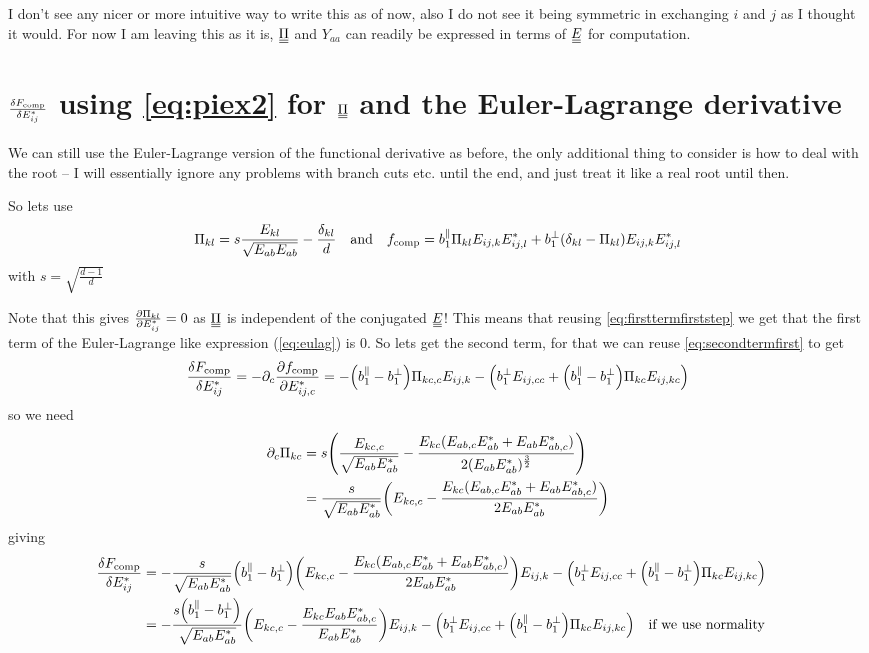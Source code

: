 \documentclass{article}
\newcommand\barbelow[1]{\stackunder[1.2pt]{$#1$}{\rule{1.5ex}{.1ex}}}
\newcommand{\du}[1]{\barbelow{\barbelow{#1}}}
\newcommand{\pp}{\partial}
\newcommand{\YY}[3][j]{E_{#2#1}E_{#3#1}^*}
\begin{document}
I don't see any nicer or more intuitive way to write this as of now, also I do not see it being symmetric in exchanging $i$ and $j$ as I thought it would.
For now I am leaving this as it is, $\du{\Pi}$ and $Y_{aa}$ can readily be expressed in terms of $\du{E}$ for computation.

\pagebreak
\section{$\fdv{F_\text{comp}}{E_{ij}^*}$ using \cref{eq:piex2} for $\du{\Pi}$ and the Euler-Lagrange derivative}
We can still use the Euler-Lagrange version of the functional derivative as before, the only additional thing to consider is how to deal with the root -- I will essentially ignore any problems with branch cuts etc. until the end, and just treat it like a real root until then.

So lets use 
\begin{equation}
    \Pi_{kl} = s \frac{E_{kl} }{\sqrt{E_{ab}E_{ab}}}- \frac{\delta_{kl}}{d} \qq{and} f_\text{comp} = b_1^\parallel \Pi_{kl} E_{ij,k}E_{ij,l}^* + b_1^\perp (\delta_{kl} - \Pi_{kl}) E_{ij,k}E_{ij,l}^*
\end{equation}
with $s = \sqrt{\frac{d-1}{d}}$

Note that this gives $\pdv{\Pi_{kl}}{E_{ij}^*} = 0$ as $\du{\Pi}$ is independent of the conjugated $\du{E}$! This means that reusing \cref{eq:firsttermfirststep} we get that the first term of the Euler-Lagrange like expression (\cref{eq:eulag}) is 0.
So lets get the second term, for that we can reuse \cref{eq:secondtermfirst} to get
\begin{equation}
    \fdv{F_\text{comp}}{E_{ij}^*} = -\pp_c \pdv{f_\text{comp}}{E_{ij,c}^*} = -\qty(b_1^\parallel - b_1^\perp) \Pi_{kc,c} E_{ij,k} - \qty(b_1^\perp E_{ij,cc} + \qty(b_1^\parallel - b_1^\perp) \Pi_{kc} E_{ij,kc})
\end{equation}
so we need
\begin{align}
    \pp_c \Pi_{kc} &= s\qty(\frac{E_{kc,c}}{\sqrt{\YY[b]{a}{a}}} - \frac{E_{kc}(E_{ab,c}E_{ab}^* + E_{ab}E_{ab,c}^*)}{2(\YY[b]{a}{a})^\frac{3}{2}}) \\
    &= \frac{s}{\sqrt{\YY[b]{a}{a}}} \qty(E_{kc,c} - \frac{E_{kc}(E_{ab,c}E_{ab}^* + E_{ab}E_{ab,c}^*)}{2\YY[b]{a}{a}}) \\
\end{align}
giving
\begin{align}
    \fdv{F_\text{comp}}{E_{ij}^*} &= -\frac{s}{\sqrt{\YY[b]{a}{a}}}\qty(b_1^\parallel - b_1^\perp) \qty(E_{kc,c} - \frac{E_{kc}(E_{ab,c}E_{ab}^* + E_{ab}E_{ab,c}^*)}{2\YY[b]{a}{a}}) E_{ij,k} - \qty(b_1^\perp E_{ij,cc} + \qty(b_1^\parallel - b_1^\perp) \Pi_{kc} E_{ij,kc}) \\
    &= -\frac{s\qty(b_1^\parallel - b_1^\perp)}{\sqrt{\YY[b]{a}{a}}} \qty(E_{kc,c} - \frac{E_{kc}E_{ab}E_{ab,c}^*}{\YY[b]{a}{a}}) E_{ij,k} - \qty(b_1^\perp E_{ij,cc} + \qty(b_1^\parallel - b_1^\perp) \Pi_{kc} E_{ij,kc}) \qq{if we use normality}
\end{align}
\end{document}
